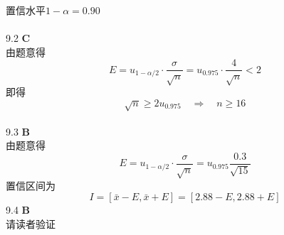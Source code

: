 \documentclass[a4paper]{ctexart}    %
\begin{document}
	置信水平$ 1 - \alpha = 0.90 $ \\ \\
	9.2 \quad \textbf{C} \\
	由题意得
	\begin{equation*}
		E = u_{1-\alpha/2} \cdot \frac{\sigma}{\sqrt{n}} = u_{0.975}\cdot\frac{4}{\sqrt{n}} < 2
	\end{equation*}
	即得
	\begin{equation*}
		\sqrt{n} \geq 2u_{0.975} \quad \Rightarrow \quad n \geq 16
	\end{equation*} \\
	9.3 \quad \textbf{B} \\
	由题意得
	\begin{equation*}
		E = u_{1-\alpha/2} \cdot \frac{\sigma}{\sqrt{n}} = u_{0.975}\frac{0.3}{\sqrt{15}}
	\end{equation*}
	置信区间为
	\begin{equation*}
		I = [\bar{x}-E, \bar{x}+E] = [2.88-E, 2.88+E]
	\end{equation*}
	9.4 \quad \textbf{B} \\
	请读者验证
	\newpage
\end{document}
